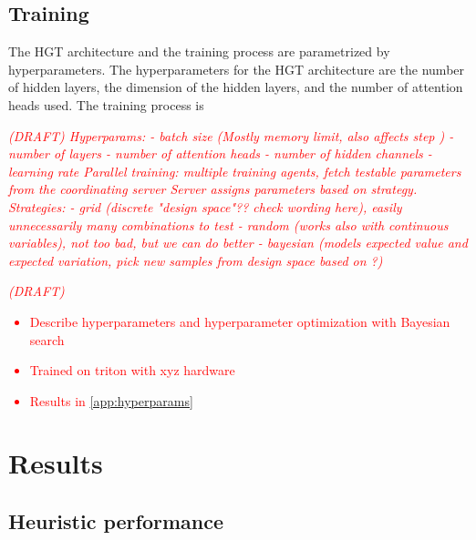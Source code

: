 \documentclass[english, 12pt, a4paper, sci, utf8, a-2b, online]{aaltothesis}
\newcommand{\draft}[1]{\textcolor{red}{\em (DRAFT) #1}}
\begin{document}
\subsection{Training}
\label{sec:training}

The HGT architecture and the training process are parametrized by hyperparameters. The hyperparameters for the HGT architecture are the number of hidden layers, the dimension of the hidden layers, and the number of attention heads used. The training process is 

\draft{   
    Hyperparams:
    - batch size (Mostly memory limit, also affects step )
    - number of layers
    - number of attention heads
    - number of hidden channels
    - learning rate
    Parallel training: multiple training agents, fetch testable parameters from the coordinating server
    Server assigns parameters based on strategy.
    Strategies:
    - grid (discrete "design space"?? check wording here), easily unnecessarily many combinations to test
    - random (works also with continuous variables), not too bad, but we can do better
    - bayesian (models expected value and expected variation, pick new samples from design space based on ?)
}
    
\draft{
    \begin{itemize}
        \item Describe hyperparameters and hyperparameter optimization with Bayesian search
        \item Trained on triton with xyz hardware
        \item Results in \cref{app:hyperparams}
    \end{itemize}
}
\clearpage
\section{Results}
\label{sec:results}
\subsection{Heuristic performance}
\label{sec:heur-perf}
\end{document}
